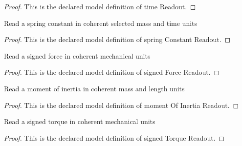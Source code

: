\begin{proof}
  This is the declared model definition of time Readout.
\end{proof}
\begin{definition}
  \label{def:physics:phyx-mini-0268:phyxminiproblems-problemphyxmini0268-springconstantreadout}
  Read a spring constant in coherent selected mass and time units
\end{definition}
\begin{proof}
  This is the declared model definition of spring Constant Readout.
\end{proof}
\begin{definition}
  \label{def:physics:phyx-mini-0268:phyxminiproblems-problemphyxmini0268-signedforcereadout}
  Read a signed force in coherent mechanical units
\end{definition}
\begin{proof}
  This is the declared model definition of signed Force Readout.
\end{proof}
\begin{definition}
  \label{def:physics:phyx-mini-0268:phyxminiproblems-problemphyxmini0268-momentofinertiareadout}
  Read a moment of inertia in coherent mass and length units
\end{definition}
\begin{proof}
  This is the declared model definition of moment Of Inertia Readout.
\end{proof}
\begin{definition}
  \label{def:physics:phyx-mini-0268:phyxminiproblems-problemphyxmini0268-signedtorquereadout}
  Read a signed torque in coherent mechanical units
\end{definition}
\begin{proof}
  This is the declared model definition of signed Torque Readout.
\end{proof}
